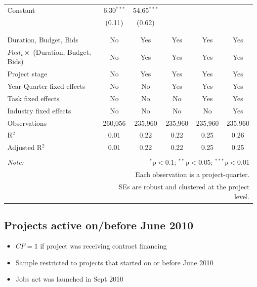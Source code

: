 \documentclass[
]{article}
\providecommand{\tightlist}{%
  \setlength{\itemsep}{0pt}\setlength{\parskip}{0pt}}
\begin{document}
\begin{table}[H]
\begin{tabular}{@{\extracolsep{-2pt}}lccccc}
 Constant & 6.30$^{***}$ & 54.65$^{***}$ &  &  &  \\ 
  & (0.11) & (0.62) &  &  &  \\ 
  & & & & & \\ 
\hline \\[-1.8ex] 
Duration, Budget, Bids & No & Yes & Yes & Yes & Yes \\ 
$Post_t \times $  (Duration, Budget, Bids) & No & Yes & Yes & Yes & Yes \\ 
Project stage & No & Yes & Yes & Yes & Yes \\ 
Year-Quarter fixed effects & No & No & Yes & Yes & Yes \\ 
Task fixed effects & No & No & No & Yes & Yes \\ 
Industry fixed effects & No & No & No & No & Yes \\ 
Observations & 260,056 & 235,960 & 235,960 & 235,960 & 235,960 \\ 
R$^{2}$ & 0.01 & 0.22 & 0.22 & 0.25 & 0.26 \\ 
Adjusted R$^{2}$ & 0.01 & 0.22 & 0.22 & 0.25 & 0.25 \\ 
\hline 
\hline \\[-1.8ex] 
\textit{Note:}  & \multicolumn{5}{r}{$^{*}$p$<$0.1; $^{**}$p$<$0.05; $^{***}$p$<$0.01} \\ 
 & \multicolumn{5}{r}{Each observation is a project-quarter.} \\ 
 & \multicolumn{5}{r}{SEs are robust and clustered at the project level.} \\ 
\end{tabular} 
\end{table}

\hypertarget{projects-active-onbefore-june-2010}{%
\subsection{Projects active on/before June
2010}\label{projects-active-onbefore-june-2010}}

\begin{itemize}
\tightlist
\item
  \(CF=1\) if project was receiving contract financing
\item
  Sample restricted to projects that started on or before June 2010
\item
  Jobs act was launched in Sept 2010
\end{itemize}
\end{document}
